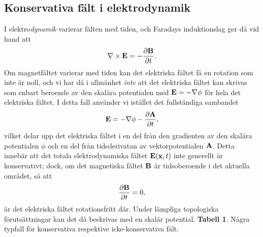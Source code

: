 \subsection{Konservativa f{\"a}lt i elektrodynamik}
I elektro{\it dynamik} varierar f{\"a}lten med tiden, och Faradays
induktionslag ger d{\aa} vid hand att
$$
  \nabla\times{\bf E}=-{{\partial{\bf B}}\over{\partial t}}.
$$
Om magnetf{\"a}ltet varierar med tiden kan det elektriska f{\"a}ltet f{\aa} en
rotation som inte {\"a}r noll, och vi har d{\aa} i allm{\"a}nhet {\it inte} att
det elektriska f{\"a}ltet kan skrivas som enbart beroende av den skal{\"a}ra
potentialen med ${\bf E}=-\nabla\phi$ f{\"o}r hela det elektriska f{\"a}ltet.
I detta fall anv{\"a}nder vi ist{\"a}llet det fullst{\"a}ndiga sambandet%
$$
  {\bf E}=-\nabla\phi-{{\partial{\bf A}}\over{\partial t}},
$$
vilket delar upp det elektriska f{\"a}ltet i en del fr{\aa}n den gradienten
av den skal{\"a}ra potentialen $\phi$ och en del fr{\aa}n tidsderivatan av
vektorpotentialen ${\bf A}$. Detta inneb{\"a}r att det totala elektrodynamiska
f{\"a}ltet ${\bf E}({\bf x},t)$ inte generellt {\"a}r konservativt; dock, om
det magnetiska f{\"a}ltet ${\bf B}$ {\"a}r tidsoberoende i det aktuella
omr{\aa}det, s{\aa} att
$$
  {{\partial{\bf B}}\over{\partial t}}=0,
$$
{\"a}r det elektriska f{\"a}ltet rotationsfritt d{\"a}r. Under l{\"a}mpliga
topologiska f{\"o}ruts{\"a}ttningar kan det d{\aa} beskrivas med en skal{\"a}r
potential.
\bigskip
\noindent
{\bf Tabell 1}. N{\aa}gra typfall f{\"o}r konservativa respektive
  icke-konservativa f{\"a}lt.
\smallskip
{
\newdimen\hcellpad
\newdimen\vcellpad
\hcellpad=4pt
\vcellpad=4pt
\offinterlineskip
}
\bigskip


